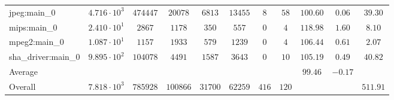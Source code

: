 \begin{tabular}{|l|c|c|c|c|c|c|c|c|c|c|}
jpeg:main\_0            & $ 4.716 \cdot 10^{3} $ & $ 474447 $ & $ 20078  $ & $ 6813  $ & $ 13455 $ & $ 8   $ & $ 58  $ & $ 100.60      $ & $ 0.06    $ & $ 39.30   $ \\
mips:main\_0            & $ 2.410 \cdot 10^{1} $ & $ 2867   $ & $ 1178   $ & $ 350   $ & $ 557   $ & $ 0   $ & $ 4   $ & $ 118.98      $ & $ 1.60    $ & $ 8.10    $ \\
mpeg2:main\_0           & $ 1.087 \cdot 10^{1} $ & $ 1157   $ & $ 1933   $ & $ 579   $ & $ 1239  $ & $ 0   $ & $ 4   $ & $ 106.44      $ & $ 0.61    $ & $ 2.07    $ \\
sha\_driver:main\_0     & $ 9.895 \cdot 10^{2} $ & $ 104078 $ & $ 4491   $ & $ 1587  $ & $ 3643  $ & $ 0   $ & $ 10  $ & $ 105.19      $ & $ 0.49    $ & $ 40.82   $ \\
\hline
Average                 & $                    $ & $        $ & $        $ & $       $ & $       $ & $     $ & $     $ & $ 99.46       $ & $ -0.17   $ & $         $ \\
\hline
Overall                 & $ 7.818 \cdot 10^{3} $ & $ 785928 $ & $ 100866 $ & $ 31700 $ & $ 62259 $ & $ 416 $ & $ 120 $ & $             $ & $         $ & $ 511.91  $ \\
\hline
\end{tabular}
